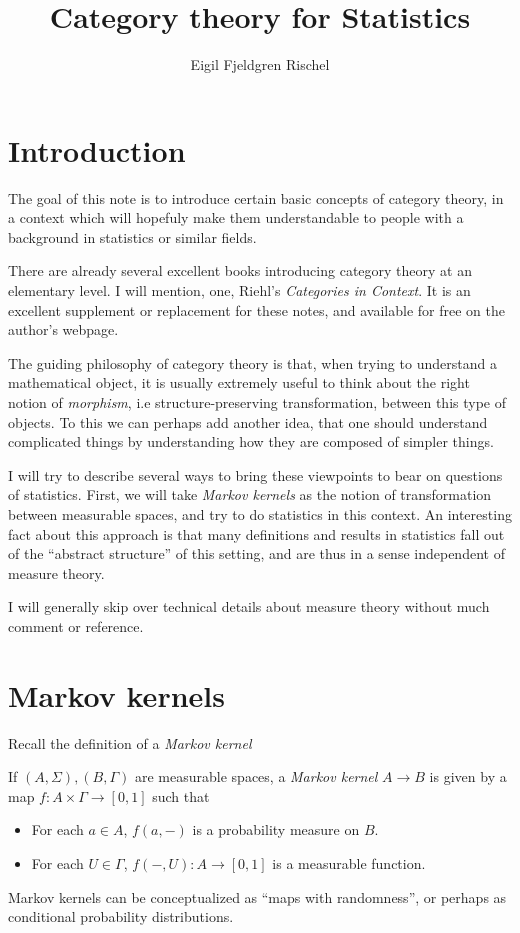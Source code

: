 \documentclass{article}
\title{Category theory for Statistics}
\author{Eigil Fjeldgren Rischel}
\date{}
\begin{document}
\maketitle
\section{Introduction}

The goal of this note is to introduce certain basic concepts of category theory, in a context which will hopefuly make them understandable to people with a background in statistics or similar fields.

There are already several excellent books introducing category theory at an elementary level. I will mention, one, Riehl's \emph{Categories in Context}.
It is an excellent supplement or replacement for these notes, and available for free on the author's webpage.

The guiding philosophy of category theory is that, when trying to understand a mathematical object, it is usually extremely useful to think about the right notion of \emph{morphism}, i.e structure-preserving transformation, between this type of objects.
To this we can perhaps add another idea, that one should understand complicated things by understanding how they are composed of simpler things.

I will try to describe several ways to bring these viewpoints to bear on questions of statistics. First, we will take \emph{Markov kernels} as the notion of transformation between measurable spaces, and try to do statistics in this context.
An interesting fact about this approach is that many definitions and results in statistics fall out of the ``abstract structure'' of this setting, and are thus in a sense independent of measure theory.

I will generally skip over technical details about measure theory without much comment or reference. 
\section{Markov kernels}
Recall the definition of a \emph{Markov kernel}
\begin{definition}
    If $(A,\Sigma), (B,\Gamma)$ are measurable spaces, a \emph{Markov kernel} $A \to B$ is given by a map $f: A \times \Gamma \to [0,1]$ such that
    \begin{itemize}
        \item For each $a\in A$, $f(a,-)$ is a probability measure on $B$.
        \item For each $U \in \Gamma$, $f(-,U): A \to [0,1]$ is a measurable function.
    \end{itemize}
\end{definition}
Markov kernels can be conceptualized as ``maps with randomness'', or perhaps as conditional probability distributions.
\end{document}
